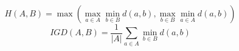 \documentclass{article}
\begin{document}
\[H(A, B) = \max \left( \max_{a \in A} \min_{b \in B} d(a, b), \max_{b \in B} \min_{a \in A} d(a, b) \right)\]
\[IGD(A, B) = \frac{1}{|A|} \sum_{a \in A} \min_{b \in B} d(a, b)\]
\end{document}
